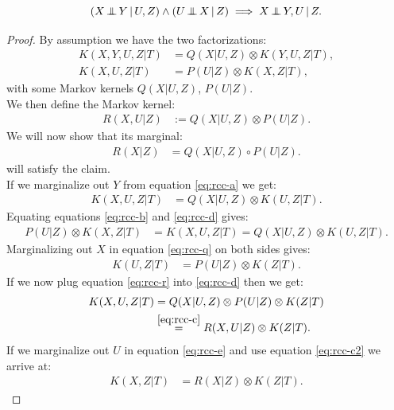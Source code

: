 \begin{Lem}
    \[ (X \operatorname*{\perp\mkern-11mu\perp}  Y \operatorname*{|} U , Z) \land (U \operatorname*{\perp\mkern-11mu\perp}  X \operatorname*{|} Z) \implies X  \operatorname*{\perp\mkern-11mu\perp}  Y , U \operatorname*{|} Z.\]
\begin{proof}
     By assumption we have the two factorizations:
    \begin{align}
        K(X,Y,U,Z|T) & = Q(X|U,Z) \otimes K(Y,U,Z|T), \label{eq:rcc-a}\\
        K(X,U,Z|T) & = P(U|Z) \otimes K(X,Z|T), \label{eq:rcc-b}
    \end{align}
     with some Markov kernels $Q(X|U,Z)$, $P(U|Z)$.\\
     We then define the Markov kernel:
    \begin{align}
        R(X,U|Z) & := Q(X|U,Z) \otimes P(U|Z). \label{eq:rcc-c}
    \end{align}
    We will now show that its marginal: 
    \begin{align}
        R(X|Z) & = Q(X|U,Z) \circ P(U|Z). \label{eq:rcc-c2}
    \end{align} 
    will satisfy the claim.\\
    If we marginalize out $Y$ from equation \ref{eq:rcc-a} we get:
    \begin{align}
        K(X,U,Z|T) & = Q(X|U,Z) \otimes K(U,Z|T). \label{eq:rcc-d}
    \end{align}
    Equating equations \ref{eq:rcc-b} and \ref{eq:rcc-d} gives:
    \begin{align}
        P(U|Z) \otimes K(X,Z|T) &=      K(X,U,Z|T)  
                                 = Q(X|U,Z) \otimes K(U,Z|T). \label{eq:rcc-q}
    \end{align}
    Marginalizing out $X$ in equation \ref{eq:rcc-q} on both sides gives:
    \begin{align}
        K(U,Z|T) &=  P(U|Z) \otimes K(Z|T).  \label{eq:rcc-r}
    \end{align}
    If we now plug equation \ref{eq:rcc-r} into \ref{eq:rcc-d} then we get:
    \begin{align}
        K(X,U,Z|T) & = Q(X|U,Z) \otimes P(U|Z) \otimes K(Z|T) \\
            &\stackrel{\ref{eq:rcc-c}}{=} R(X,U|Z) \otimes K(Z|T). \label{eq:rcc-e}
    \end{align}
    If we marginalize out $U$ in equation \ref{eq:rcc-e} and use equation \ref{eq:rcc-c2}  we arrive at:
    \begin{align}
        K(X,Z|T) & = R(X|Z) \otimes K(Z|T). \label{eq:rcc-f}
    \end{align}

\end{proof}
\end{Lem}
